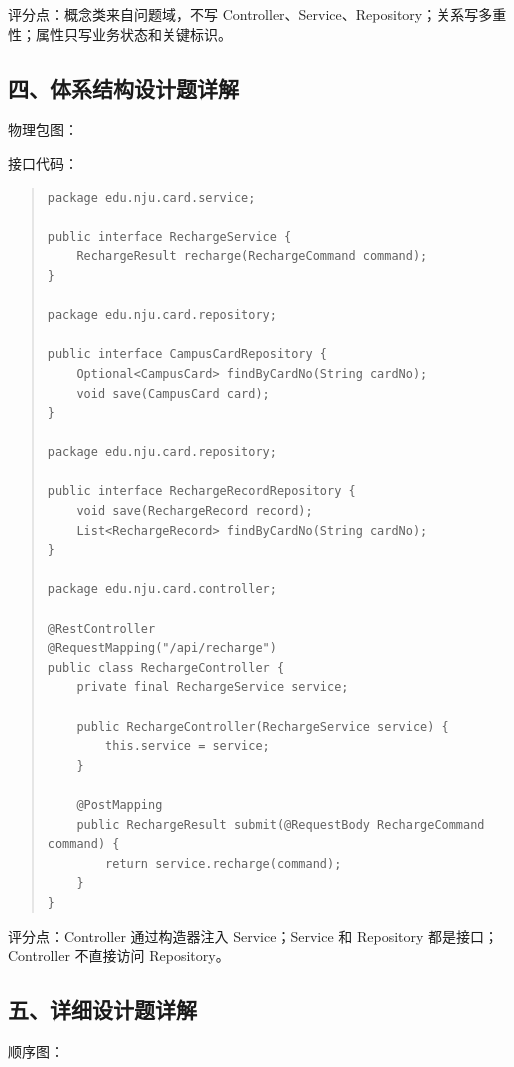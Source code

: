 \documentclass[UTF8,zihao=-4]{ctexart}
\begin{document}
评分点：概念类来自问题域，不写 Controller、Service、Repository；关系写多重性；属性只写业务状态和关键标识。


\subsection{四、体系结构设计题详解}


物理包图：





接口代码：


\begin{quote}
\footnotesize
\begin{verbatim}
package edu.nju.card.service;

public interface RechargeService {
    RechargeResult recharge(RechargeCommand command);
}

package edu.nju.card.repository;

public interface CampusCardRepository {
    Optional<CampusCard> findByCardNo(String cardNo);
    void save(CampusCard card);
}

package edu.nju.card.repository;

public interface RechargeRecordRepository {
    void save(RechargeRecord record);
    List<RechargeRecord> findByCardNo(String cardNo);
}

package edu.nju.card.controller;

@RestController
@RequestMapping("/api/recharge")
public class RechargeController {
    private final RechargeService service;

    public RechargeController(RechargeService service) {
        this.service = service;
    }

    @PostMapping
    public RechargeResult submit(@RequestBody RechargeCommand command) {
        return service.recharge(command);
    }
}
\end{verbatim}
\end{quote}



评分点：Controller 通过构造器注入 Service；Service 和 Repository 都是接口；Controller 不直接访问 Repository。


\subsection{五、详细设计题详解}


顺序图：
\end{document}
